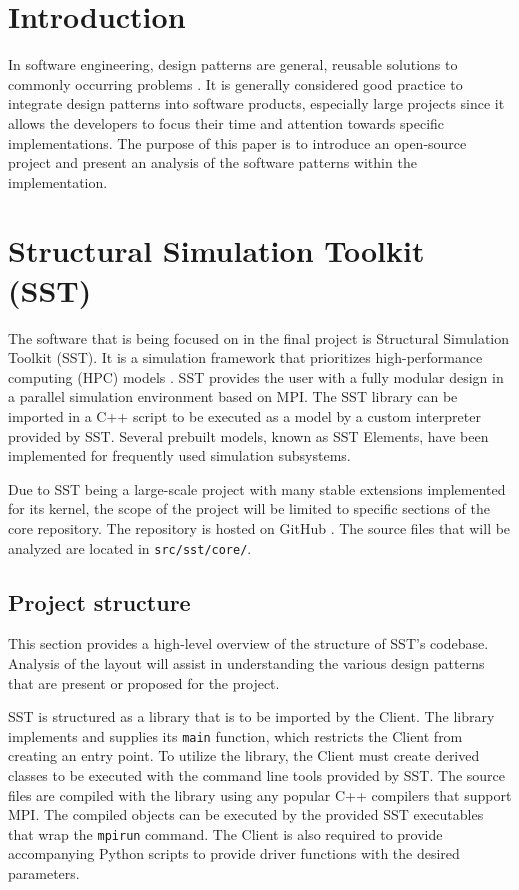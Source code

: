 \section{Introduction}
In software engineering, design patterns are general, reusable solutions to commonly occurring problems \cite{source-making}. It is generally considered good practice to integrate design patterns into software products, especially large projects since it allows the developers to focus their time and attention towards specific implementations. The purpose of this paper is to introduce an open-source project and present an analysis of the software patterns within the implementation.

\section{Structural Simulation Toolkit (SST)}
The software that is being focused on in the final project is Structural Simulation Toolkit (SST). It is a simulation framework that prioritizes high-performance computing (HPC) models \cite{sst}. SST provides the user with a fully modular design in a parallel simulation environment based on MPI. The SST library can be imported in a C++ script to be executed as a model by a custom interpreter provided by SST. Several prebuilt models, known as SST Elements, have been implemented for frequently used simulation subsystems.

Due to SST being a large-scale project with many stable extensions implemented for its kernel, the scope of the project will be limited to specific sections of the core repository. The repository is hosted on GitHub \cite{sst-repo}. The source files that will be analyzed are located in \texttt{src/sst/core/}.

\subsection{Project structure}
This section provides a high-level overview of the structure of SST's codebase. Analysis of the layout will assist in understanding the various design patterns that are present or proposed for the project.

SST is structured as a library that is to be imported by the Client. The library implements and supplies its \texttt{main} function, which restricts the Client from creating an entry point. To utilize the library, the Client must create derived classes to be executed with the command line tools provided by SST. The source files are compiled with the library using any popular C++ compilers that support MPI. The compiled objects can be executed by the provided SST executables that wrap the \texttt{mpirun} command. The Client is also required to provide accompanying Python scripts to provide driver functions with the desired parameters.

